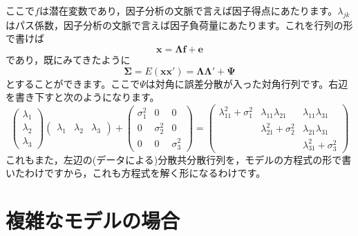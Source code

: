 \documentclass{ltjsbook}
\begin{document}
ここで$f$は潜在変数であり，因子分析の文脈で言えば因子得点にあたります。$\lambda_{jk}$はパス係数，因子分析の文脈で言えば因子負荷量にあたります。これを行列の形で書けば
\[ \bm{x} = \bm{\Lambda f} + \bm{e} \]
であり，既にみてきたように
\[ \bm{\Sigma} = E(\bm{xx}' )= \bm{\Lambda \Lambda}' + \bm{\Psi} \]
とすることができます。ここで$\Psi$は対角に誤差分散が入った対角行列です。右辺を書き下すと次のようになります。
\[
	\begin{pmatrix} \lambda_1\\ \lambda_2 \\ \lambda_3 \end{pmatrix}\begin{pmatrix} \lambda_1 & \lambda_2 & \lambda_3 \end{pmatrix} + \begin{pmatrix} \sigma_1^2 & 0& 0\\ 0& \sigma_2^2 & 0\\0 &0 & \sigma_3^2 \end{pmatrix}
	=
	\begin{pmatrix} \lambda_{11}^2 + \sigma_1^2 & \lambda_{11}\lambda_{21}    & \lambda_{11} \lambda_{31}   \\
                                            & \lambda_{21}^2 + \sigma_2^2 & \lambda_{21} \lambda_{31}   \\
                                            &                             & \lambda_{31}^2 + \sigma_3^2\end{pmatrix}
\]
これもまた，左辺の(データによる)分散共分散行列を，モデルの方程式の形で書いたわけですから，これも方程式を解く形になるわけです。

\section{複雑なモデルの場合}
\end{document}
